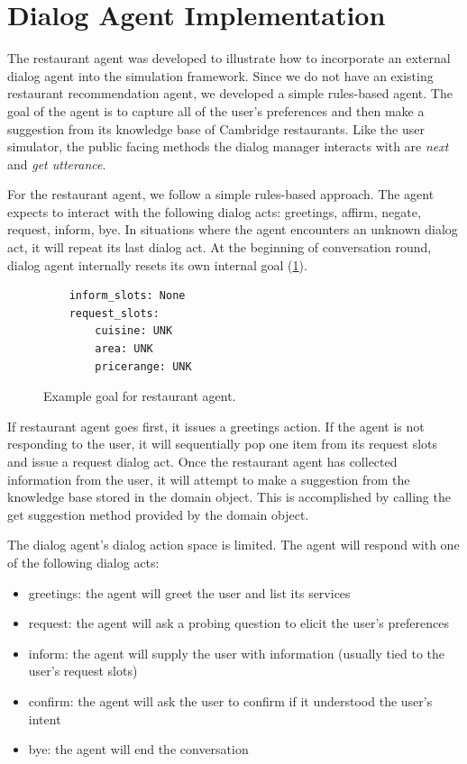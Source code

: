 \section{Dialog Agent Implementation}

The restaurant agent was developed to illustrate how to incorporate an external dialog agent into the simulation framework. Since we do not have an existing restaurant recommendation agent, we developed a simple rules-based agent. The goal of the agent is to capture all of the user's preferences and then make a suggestion from its knowledge base of Cambridge restaurants. Like the user simulator, the public facing methods the dialog manager interacts with are \textit{next} and \textit{get utterance}. 

For the restaurant agent, we follow a simple rules-based approach. The agent expects to interact with the following dialog acts: greetings, affirm, negate, request, inform, bye. In situations where the agent encounters an unknown dialog act, it will repeat its last dialog act. At the beginning of conversation round, dialog agent internally resets its own internal goal (\ref{fig:ex_res_agent_goal}). 

 \begin{figure}[h!]
 	\begin{lstlisting}
 	inform_slots: None
 	request_slots:
 		cuisine: UNK
 		area: UNK
 		pricerange: UNK 	
 	\end{lstlisting}
 	\caption{ Example goal for restaurant agent.}
 	\label{fig:ex_res_agent_goal}
 \end{figure}

If restaurant agent goes first, it issues a greetings action. If the agent is not responding to the user, it will sequentially pop one item from its request slots and issue a request dialog act. Once the restaurant agent has collected information from the user, it will attempt to make a suggestion from the knowledge base stored in the domain object. This is accomplished by calling the get suggestion method provided by the domain object.

The dialog agent's dialog action space is limited. The agent will respond with one of the following dialog acts:
\begin{itemize}
	\item greetings: the agent will greet the user and list its services
	\item request: the agent will ask a probing question to elicit the user's preferences
	\item inform: the agent will supply the user with information (usually tied to the user's request slots)
	\item confirm: the agent will ask the user to confirm if it understood the user's intent 
	\item bye: the agent will end the conversation  
\end{itemize}

